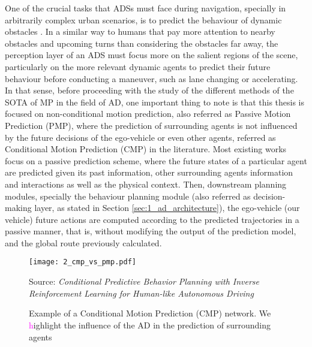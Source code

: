 One of the crucial tasks that \acp{ADS} must face during navigation, specially in arbitrarily complex urban scenarios, is to predict the behaviour of dynamic obstacles \cite{chang2019argoverse, salzmann2020trajectron++}. In a similar way to humans that pay more attention to nearby obstacles and upcoming turns than considering the obstacles far away, the perception layer of an \ac{ADS} must focus more on the salient regions of the scene, particularly on the more relevant dynamic agents to predict their future behaviour before conducting a maneuver, such as lane changing or accelerating. In that sense, before proceeding with the study of the different methods of the \ac{SOTA} of \ac{MP} in the field of \ac{AD}, one important thing to note is that this thesis is focused on non-conditional motion prediction, also referred as Passive Motion Prediction (PMP), where the prediction of surrounding agents is not influenced by the future decisions of the ego-vehicle or even other agents, referred as Conditional Motion Prediction (CMP) in the literature. Most existing works \cite{gilles2021home, gilles2022gohome, varadarajan2022multipath++, wang2022ganet, schmidt2022crat, liang2020learning} focus on a passive prediction scheme, where the future states of a particular agent are predicted given its past information, other surrounding agents information and interactions as well as the physical context. Then, downstream planning modules, specially the behaviour planning module (also referred as decision-making layer, as stated in Section \ref{sec:1_ad_architecture}), the ego-vehicle (our vehicle) future actions are computed according to the predicted trajectories in a passive manner, that is, without modifying the output of the prediction model, and the global route previously calculated. \\

\begin{figure}[h]
	\centering
	\texttt{[image: 2\_cmp\_vs\_pmp.pdf]}
	\caption{Example of a Conditional Motion Prediction (CMP) network. We \textcolor{magenta}highlight the influence of the \ac{AD} in the prediction of surrounding agents}
	Source: \textit{Conditional Predictive Behavior Planning with Inverse Reinforcement Learning for Human-like Autonomous Driving} \cite{huang2023conditional}
	\label{fig:2_cmp_vs_pmp}
\end{figure}

